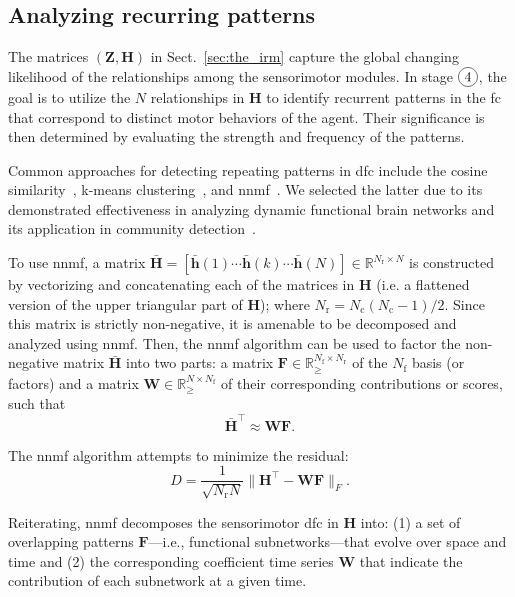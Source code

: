 \documentclass[letterpaper, 10 pt, conference]{ieeeconf}  %
\newcommand*\circled[1]{\tikz[baseline=(char.base)]{
            \node[shape=circle,draw,inner sep=2pt] (char) {#1};}}
\begin{document}
\subsection{Analyzing recurring patterns}
The matrices $(\bm{Z}, \bm{H})$ in Sect.~\ref{sec:the_irm} capture the global changing likelihood of the relationships among the sensorimotor modules. In stage $\circled{4}$, the goal is to utilize the $N$ relationships in $\bm{H}$ to identify recurrent patterns in the \ac{fc} that correspond to distinct motor behaviors of the agent. Their significance is then determined by evaluating the strength and frequency of the patterns.

Common approaches for detecting repeating patterns in \ac{dfc} include the cosine similarity~\cite{Menon2019comparisonstaticdynamic}, k-means clustering~\cite{Li2017Hightransitionfrequencies}, and \ac{nnmf}~\cite{Fu2019Nonnegativematrixfactorization}. We selected the latter due to its demonstrated effectiveness in analyzing dynamic functional brain networks and its application in community detection~\cite{Luo2021Symmetricnonnegativematrix}.

To use \ac{nnmf}, a matrix $\bar{\bm{H}} = [\bar{\bm{h}}(1) \cdots \bar{\bm{h}}(k) \cdots \bar{\bm{h}}(N)] \in \mathbb{R}^{N_\text{r}\times N}$ is constructed by vectorizing and concatenating each of the matrices in $\bm{H}$ (i.e. a flattened version of the upper triangular part of $\bm{H}$); where $N_\text{r} = N_\text{c}(N_\text{c}-1)/2$. Since this matrix is strictly non-negative, it is amenable to be decomposed and analyzed using \ac{nnmf}. Then, the \ac{nnmf} algorithm can be used to factor the non-negative matrix $\bar{\bm{H}}$ into two parts: a matrix $\bm{F} \in \mathbb{R}^{N_\text{f}\times N_\text{r}}_{\geq}$ of the $N_\text{f}$ basis (or factors) and a matrix $\bm{W} \in \mathbb{R}^{N\times N_\text{f}}_{\geq}$ of their corresponding contributions or scores, such that
\begin{equation}
    \bar{\bm{H}}^{\top} \approx \bm{W} \bm{F}.
    \label{eq:nnmf}
\end{equation}

The \ac{nnmf} algorithm attempts to minimize the residual: 
\begin{equation}    
    D=\dfrac{1}{\sqrt{N_\text{r} N}}\|\bm{H}^{\top}-\bm{W} \bm{F}\|_F.
    \label{eq:residual}
\end{equation}

Reiterating, \ac{nnmf} decomposes the sensorimotor \ac{dfc} in $\bm{H}$ into: (1) a set of overlapping patterns $\bm{F}$---i.e., functional subnetworks---that evolve over space and time and (2) the corresponding coefficient time series $\bm{W}$ that indicate the contribution of each subnetwork at a given time.
\end{document}
